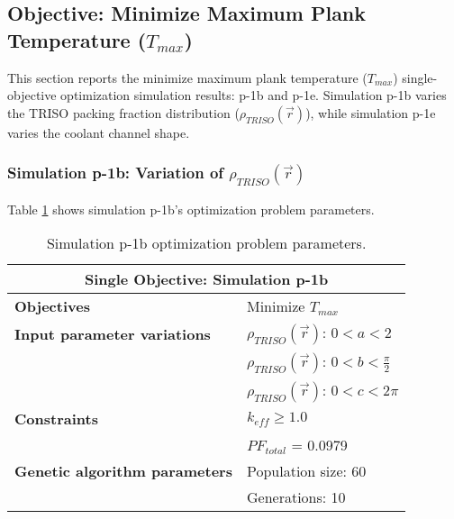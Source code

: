 \subsection{Objective: Minimize Maximum Plank Temperature ($T_{max}$)}
\label{sec:plank-1-obj-temp}
This section reports the minimize maximum plank temperature ($T_{max}$) 
single-objective optimization simulation results: p-1b and p-1e. 
Simulation p-1b varies the \gls{TRISO} packing fraction distribution 
($\rho_{TRISO}(\vec{r})$), while simulation p-1e varies the coolant channel shape. 

\subsubsection{Simulation p-1b: Variation of $\rho_{TRISO}(\vec{r})$}
Table \ref{tab:simulationp1b} shows simulation p-1b's optimization problem parameters. 
\begin{table}[htbp!]
    \centering
    \onehalfspacing
    \caption{Simulation p-1b optimization problem parameters.}
	\label{tab:simulationp1b}
    \footnotesize
    \begin{tabular}{l|p{4cm}}
    \hline 
    \multicolumn{2}{c}{\textbf{Single Objective: Simulation p-1b}} \\
    \hline 
    \textbf{Objectives} & Minimize $T_{max}$ \\
    \hline 
    \textbf{Input parameter variations}     
    & $\rho_{TRISO}(\vec{r})$: $0<a<2$ \\
    & $\rho_{TRISO}(\vec{r})$: $0<b<\frac{\pi}{2}$ \\
    & $\rho_{TRISO}(\vec{r})$: $0<c<2\pi$ \\
    \hline
    \textbf{Constraints} & $k_{eff} \geq 1.0$\\ 
    & $PF_{total}$ = 0.0979\\
    \hline 
    \textbf{Genetic algorithm parameters} & Population size: 60 \\
    & Generations: 10 \\
    \hline
    \end{tabular}
\end{table}


